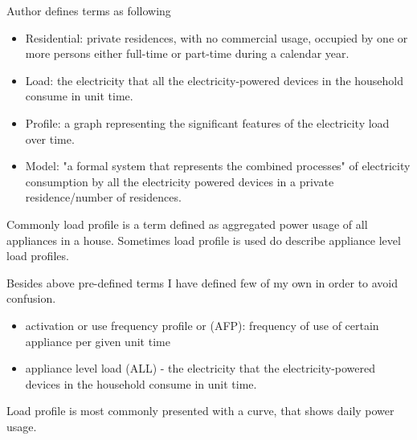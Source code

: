\documentclass[
11pt, %
english, %
singlespacing, %
headsepline, %
]{MastersDoctoralThesis} %
\begin{document}
Author \cite{Review2021} defines terms as following

\begin{itemize}
	\item Residential: private residences, with no commercial usage, occupied by one or more persons either full-time or part-time during a calendar year.
	\item Load: the electricity that all the electricity-powered devices in the household consume in unit time.
	\item Profile: a graph representing the significant features of the electricity load over time.
	\item Model: "a formal system that represents the combined processes" \cite{KAVOUSIAN2013184} of electricity consumption by all the electricity powered devices in a private residence/number of residences.
\end{itemize}

Commonly load profile is a term defined as aggregated power usage of all appliances in a house. 
Sometimes load profile is used do describe appliance level load profiles. 

Besides above pre-defined terms I have defined few of my own in order to avoid confusion.
\begin{itemize}
	\item activation or use frequency profile or (AFP): frequency of use of certain appliance per given unit time
	\item appliance level load (ALL) - the electricity that the electricity-powered devices in the household consume in unit time.
\end{itemize}

Load profile is most commonly presented with a curve, that shows daily power usage.
\end{document}
